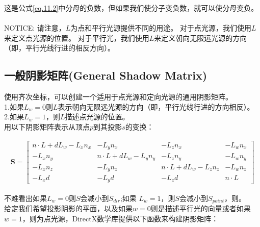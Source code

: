 \begin{flushleft}
这是公式\ref{eq.11.2}中分母的负数，但如果我们使分子变负数，就可以使分母变负。\\

~\\
NOTICE: 请注意，$L$为点和平行光源提供不同的用途。 对于点光源，我们使用$L$来定义点光源的位置。 对于平行光，我们使用$L$来定义朝向无限远光源的方向（即，平行光线行进的相反方向）。
~\\
\end{flushleft}

\subsection{一般阴影矩阵(General Shadow Matrix)}
\begin{flushleft}
使用齐次坐标，可以创建一个适用于点光源和定向光源的通用阴影矩阵。\\

1.如果$L_{w}=0$则$L$表示朝向无限远光源的方向（即，平行光线行进的方向相反）。\\
2.如果$L_{w}=1$，则$L$描述点光源的位置。\\

用以下阴影矩阵表示从顶点$p$到其投影$s$的变换：\\
\end{flushleft}

\begin{align*}
\boldsymbol{S}=\begin{bmatrix}
 n\cdot L+dL_{w}-L_{x}n_{x} & -L_{y}n_{x} & -L_{z}n_{x} & -L_{w}n_{x} \\
 -L_{x}n_{y} & n\cdot L+dL_{w}-L_{y}n_{y} & -L_{z}n_{y} & -L_{w}n_{y} \\
 -L_{x}n_{z} & -L_{y}n_{z} & n\cdot L+dL_{w}-L_{z}n_{z} & -L_{w}n_{z} \\
 -L_{x}d & -L_{y}d & -L_{z}d & n\cdot L
\end{bmatrix}
\end{align*}

\begin{flushleft}
不难看出如果$L_{w}=0$则$S$会减小到$S_{dir}$;如果 $L_{w}=1$，则$S$会减小到$S_{point}$，则。\\

给定我们希望投影阴影的平面，以及如果$w=0$则是描述平行光的向量或者如果$w=1$，则为点光源，DirectX数学库提供以下函数来构建阴影矩阵：\\
\end{flushleft}

